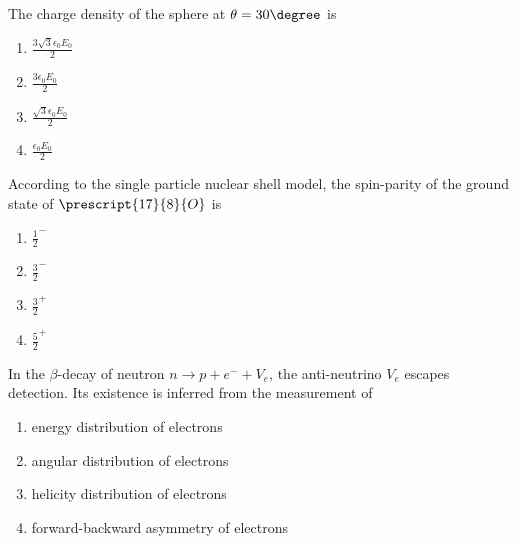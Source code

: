 The charge density of the sphere at $\theta = 30\degree$ is
\begin{multicols}{4}
    \begin{enumerate}
        \item $\frac{3\sqrt{3}\epsilon_0E_0}{2}$
        \item $\frac{3\epsilon_0E_0}{2}$
        \item $\frac{\sqrt{3}\epsilon_0E_0}{2}$
        \item $\frac{\epsilon_0E_0}{2}$
    \end{enumerate}
\end{multicols}
\item According to the single particle nuclear shell model, the spin-parity of the ground state of $\prescript{17}{8}{O}$ is
\begin{multicols}{4}
    \begin{enumerate}
        \item $\frac{1}{2}^-$
        \item $\frac{3}{2}^-$
        \item $\frac{3}{2}^+$
        \item $\frac{5}{2}^+$
    \end{enumerate}
\end{multicols}
\item In the $\beta$-decay of neutron $n\rightarrow p+e^-+V_e$, the anti-neutrino $V_e$ escapes detection. Its existence is inferred from the measurement of
\begin{enumerate}
    \item energy distribution of electrons
    \item angular distribution of electrons
    \item helicity distribution of electrons 
    \item forward-backward asymmetry of electrons
\end{enumerate}

